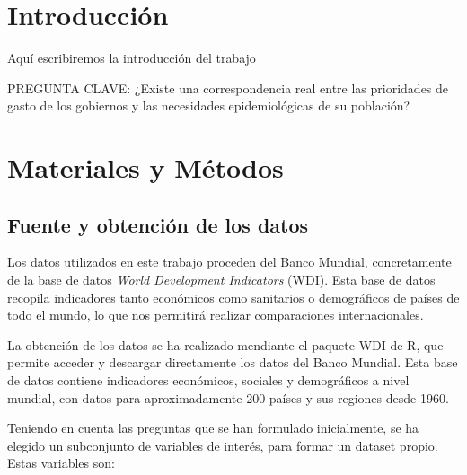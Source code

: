 \documentclass[,article,,moreauthors,pdftex]{Definitions/mdpi}
\begin{document}

\section{Introducción}\label{introducciuxf3n}

Aquí escribiremos la introducción del trabajo

PREGUNTA CLAVE: ¿Existe una correspondencia real entre las prioridades
de gasto de los gobiernos y las necesidades epidemiológicas de su
población?

\section{Materiales y Métodos}\label{materiales-y-muxe9todos}

\subsection{Fuente y obtención de los
datos}\label{fuente-y-obtenciuxf3n-de-los-datos}

Los datos utilizados en este trabajo proceden del Banco Mundial,
concretamente de la base de datos \emph{World Development Indicators}
(WDI). Esta base de datos recopila indicadores tanto económicos como
sanitarios o demográficos de países de todo el mundo, lo que nos
permitirá realizar comparaciones internacionales.

La obtención de los datos se ha realizado mendiante el paquete WDI de R,
que permite acceder y descargar directamente los datos del Banco
Mundial. Esta base de datos contiene indicadores económicos, sociales y
demográficos a nivel mundial, con datos para aproximadamente 200 países
y sus regiones desde 1960.

Teniendo en cuenta las preguntas que se han formulado inicialmente, se
ha elegido un subconjunto de variables de interés, para formar un
dataset propio. Estas variables son:
\end{document}
